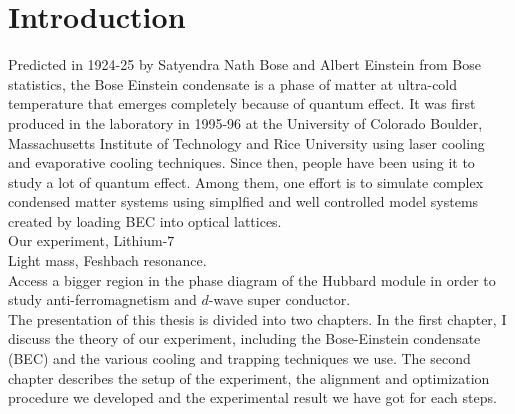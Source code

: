 \chapter*{Introduction}

Predicted in 1924-25 by Satyendra Nath Bose and Albert Einstein from Bose statistics, the Bose Einstein condensate is a phase of matter at ultra-cold temperature that emerges completely because of quantum effect. It was first produced in the laboratory in 1995-96 at the University of Colorado Boulder, Massachusetts Institute of Technology and Rice University using laser cooling and evaporative cooling techniques. Since then, people have been using it to study a lot of quantum effect. Among them, one effort is to simulate complex condensed matter systems using simplfied and well controlled model systems created by loading BEC into optical lattices.\\

Our experiment, Lithium-$7$\\
Light mass, Feshbach resonance.\\
Access a bigger region in the phase diagram of the Hubbard module in order to study anti-ferromagnetism and $d$-wave super conductor.\\


The presentation of this thesis is divided into two chapters. In the first chapter, I discuss the theory of our experiment, including the Bose-Einstein condensate (BEC) and the various cooling and trapping techniques we use. The second chapter describes the setup of the experiment, the alignment and optimization procedure we developed and the experimental result we have got for each steps.
